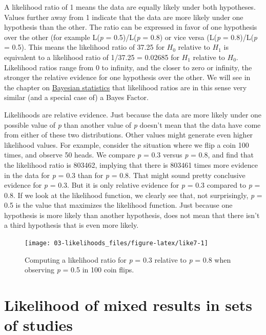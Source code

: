 \documentclass[
  oneside]{book}
\begin{document}
A likelihood ratio of 1 means the data are equally likely under both hypotheses. Values further away from 1 indicate that the data are more likely under one hypothesis than the other. The ratio can be expressed in favor of one hypothesis over the other (for example L(\emph{p} = 0.5)/L(\emph{p} = 0.8) or vice versa (L(\emph{p} = 0.8)/L(\emph{p} = 0.5). This means the likelihood ratio of 37.25 for \(H_0\) relative to \(H_1\) is equivalent to a likelihood ratio of 1/37.25 = 0.02685 for \(H_1\) relative to \(H_0\). Likelihood ratios range from 0 to infinity, and the closer to zero or infinity, the stronger the relative evidence for one hypothesis over the other. We will see in the chapter on \protect\hyperlink{bayes}{Bayesian statistics} that likelihood ratios are in this sense very similar (and a special case of) a Bayes Factor.

Likelihoods are relative evidence. Just because the data are more likely under one possible value of \emph{p} than another value of \emph{p} doesn't mean that the data have come from either of these two distributions. Other values might generate even higher likelihood values. For example, consider the situation where we flip a coin 100 times, and observe 50 heads. We compare \emph{p} = 0.3 versus \emph{p} = 0.8, and find that the likelihood ratio is 803462, implying that there is 803461 times more evidence in the data for \emph{p} = 0.3 than for \emph{p} = 0.8. That might sound pretty conclusive evidence for \emph{p} = 0.3. But it is only relative evidence for \emph{p} = 0.3 compared to \emph{p} = 0.8. If we look at the likelihood function, we clearly see that, not surprisingly, \emph{p} = 0.5 is the value that maximizes the likelihood function. Just because one hypothesis is more likely than another hypothesis, does not mean that there isn't a third hypothesis that is even more likely.



\begin{figure}

{\centering \texttt{[image: 03-likelihoods\_files/figure-latex/like7-1]} 

}

\caption{Computing a likelihood ratio for \emph{p} = 0.3 relative to \emph{p} = 0.8 when observing \emph{p} = 0.5 in 100 coin flips.}\label{fig:like7}
\end{figure}

\hypertarget{likelihood-of-mixed-results-in-sets-of-studies}{%
\section{Likelihood of mixed results in sets of studies}\label{likelihood-of-mixed-results-in-sets-of-studies}}
\end{document}
